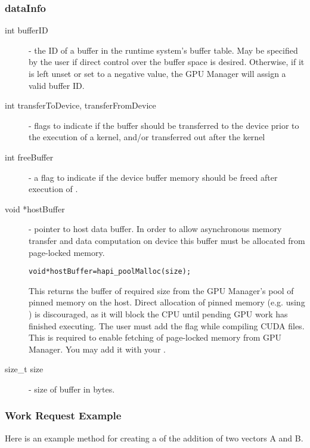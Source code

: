 \subsubsection{dataInfo}
\begin{description}
\item[int bufferID]- the ID of a buffer in the runtime system's buffer table.
May be specified by the user if direct control over the buffer space is
desired. Otherwise, if it is left unset or set to a negative value, the GPU Manager will
assign a valid buffer ID.

\item[int transferToDevice, transferFromDevice]- flags to indicate if the buffer
should be transferred to the device prior to the execution of a kernel, and/or
transferred out after the kernel

\item[int freeBuffer]- a flag to indicate if the device buffer memory should be
freed after execution of .

\item[void *hostBuffer]- pointer to host data buffer. In order to allow
asynchronous memory transfer and data computation on device this buffer must
be allocated from page-locked memory.
\begin{alltt}
void *hostBuffer = hapi\_poolMalloc(size);
\end{alltt}
This returns the buffer of required size from the GPU Manager's pool of pinned memory on the host.
Direct allocation of pinned memory (e.g. using ) is discouraged,
as it will block the CPU until pending GPU work has finished executing.
The user must add the  flag while compiling CUDA files.
This is required to enable fetching of page-locked memory from GPU Manager.
You may add it with your .

\item[size\_t size]- size of buffer in bytes.
\end{description}

\subsubsection{Work Request Example}

Here is an example method for creating a  of the addition of
two vectors A and B.

